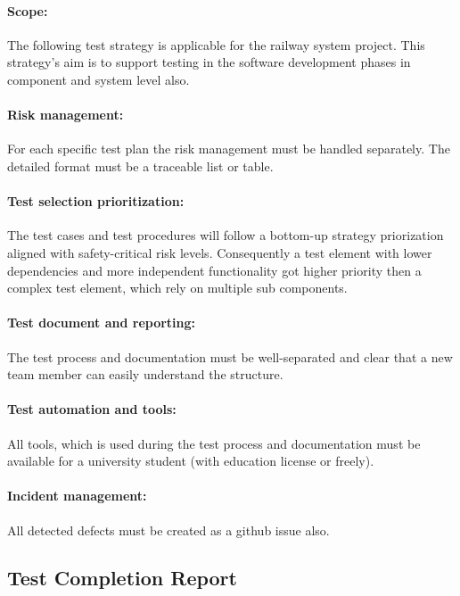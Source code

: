 \paragraph{Scope:} The following test strategy is applicable for the railway system project. This strategy's aim is to support testing in the software development phases in component and system level also.
\paragraph{Risk management:} For each specific test plan the risk management must be handled separately. The detailed format must be a traceable list or table. 
\paragraph{Test selection prioritization:} The test cases and test procedures will follow a bottom-up strategy priorization aligned with safety-critical risk levels. Consequently a test element with lower dependencies and more independent functionality got higher priority then a complex test element, which rely on multiple sub components. 
\paragraph{Test document and reporting:} The test process and documentation must be well-separated and clear that a new team member can easily understand the structure.
\paragraph{Test automation and tools:} All tools, which is used during the test process and documentation must be available for a university student (with education license or freely).
\paragraph{Incident management:} All detected defects must be created as a github issue also.

\subsection{Test Completion Report}

